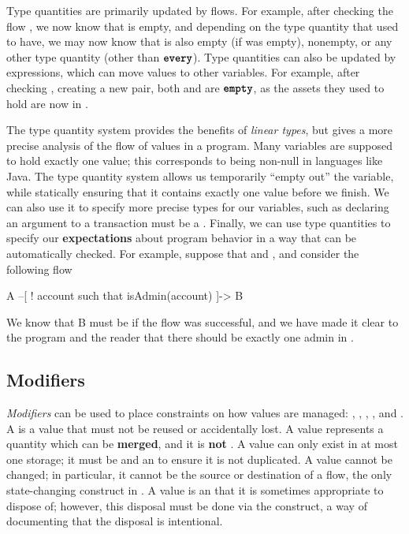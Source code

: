\documentclass[dvipsnames, usenames, sigconf]{acmart}
\begin{document}
Type quantities are primarily updated by flows.
For example, after checking the flow , we now know that  is empty, and depending on the type quantity that  used to have, we may now know that  is also empty (if  was empty), nonempty, or any other type quantity (other than $\textbf{\texttt{every}}$).
Type quantities can also be updated by expressions, which can move values to other variables.
For example, after checking , creating a new pair, both  and  are $\textbf{\texttt{empty}}$, as the assets they used to hold are now in .

The type quantity system provides the benefits of \emph{linear types}, but gives a more precise analysis of the flow of values in a program.
Many variables are supposed to hold exactly one value; this corresponds to being non-null in languages like Java.
The type quantity system allows us temporarily ``empty out'' the variable, while statically ensuring that it contains exactly one value before we finish.
We can also use it to specify more precise types for our variables, such as declaring an argument to a transaction must be a .
Finally, we can use type quantities to specify our \textbf{expectations} about program behavior in a way that can be automatically checked.
For example, suppose that  and , and consider the following flow
\begin{flow}
A --[ ! account such that isAdmin(account) ]-> B
\end{flow}
We know that B must be  if the flow was successful, and we have made it clear to the program and the reader that there should be exactly one admin in .

\subsection{Modifiers}\label{sec:lang-modifiers}
\emph{Modifiers} can be used to place constraints on how values are managed: , , , , and .
A  is a value that must not be reused or accidentally lost.
A  value represents a quantity which can be \textbf{merged}, and it is \textbf{not} .
A  value can only exist in at most one storage; it must be  and an  to ensure it is not duplicated.
A  value cannot be changed; in particular, it cannot be the source or destination of a flow, the only state-changing construct in \langName.
A  value is an  that it is sometimes appropriate to dispose of; however, this disposal must be done via the  construct, a way of documenting that the disposal is intentional.
\end{document}
